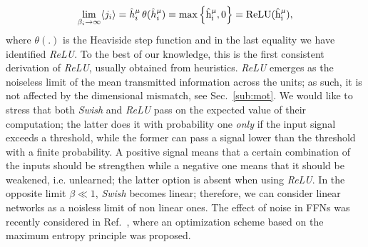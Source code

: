 \documentclass{article}
\begin{document}
%
\begin{equation} \label{eq:ps6}
\lim_{\beta_i \to \infty } \langle j_i \rangle =  \hat{h}^{\mu}_i \, \theta(\hat{h}^{\mu}_i)  \equiv   \rm{max} \left\{ \hat{h}^{\mu}_i, 0\right\} = ReLU(\hat{h}^{\mu}_i),
\end{equation}
%
where $\theta(.)$ is the Heaviside step function and in the last equality we have identified {\it ReLU}. To the best of our knowledge, this is the first consistent derivation of {\it ReLU}, usually obtained from heuristics. {\it ReLU} emerges as the noiseless limit of the mean transmitted information across the units; as such, it is not affected by the dimensional mismatch, see Sec.~\eqref{sub:mot}. We would like to stress that both {\it Swish} and {\it ReLU} pass on the expected value of their computation; the latter does it with probability one {\it only} if the input signal exceeds a threshold, while the former can pass a signal lower than the threshold with a finite probability. A positive signal means that a certain combination of the inputs should be strengthen while a negative one means that it should be weakened, i.e. unlearned; the latter option is absent when using {\it ReLU}. In the opposite limit $\beta \ll 1$, {\it Swish} becomes linear; therefore, we can consider linear networks as a noisless limit of non linear ones. The effect of noise in FFNs was recently considered in Ref.~\cite{pratik}, where an optimization scheme based on the maximum entropy principle was proposed.
\end{document}
